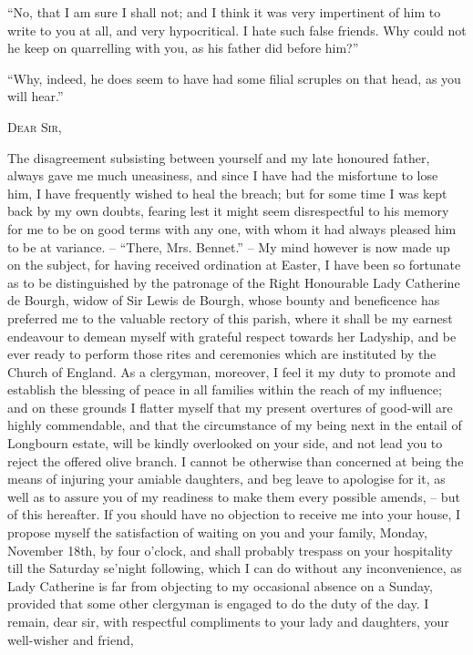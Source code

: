 “No, that I am sure I shall not; and I think it was
very impertinent of him to write to you at all, and very
hypocritical. I hate such false friends. Why could not
he keep on quarrelling with you, as his father did before
him?”

“Why, indeed, he does seem to have had some filial
scruples on that head, as you will hear.”

\begin{letter}

\textsc{Dear Sir},

The disagreement subsisting between yourself and
my late honoured father, always gave me much uneasiness,
and since I have had the misfortune to lose him, I have
frequently wished to heal the breach; but for some time
I was kept back by my own doubts, fearing lest it might
seem disrespectful to his memory for me to be on good
terms with any one, with whom it had always pleased
him to be at variance. -- “There, Mrs. Bennet.” -- My mind
however is now made up on the subject, for having received
ordination at Easter, I have been so fortunate as to be
distinguished by the patronage of the Right Honourable
Lady Catherine de Bourgh, widow of Sir Lewis de Bourgh,
whose bounty and beneficence has preferred me to the
valuable rectory of this parish, where it shall be my
earnest endeavour to demean myself with grateful respect
towards her Ladyship, and be ever ready to perform those
rites and ceremonies which are instituted by the Church
of England. As a clergyman, moreover, I feel it my duty
to promote and establish the blessing of peace in all families
within the reach of my influence; and on these grounds
I flatter myself that my present overtures of good-will
are highly commendable, and that the circumstance of
my being next in the entail of Longbourn estate, will be
kindly overlooked on your side, and not lead you to reject
the offered olive branch. I cannot be otherwise than
concerned at being the means of injuring your amiable
daughters, and beg leave to apologise for it, as well as to
assure you of my readiness to make them every possible
amends, -- but of this hereafter. If you should have no
objection to receive me into your house, I propose myself
the satisfaction of waiting on you and your family,
Monday, November 18th, by four o’clock, and shall
probably trespass on your hospitality till the Saturday
se’night following, which I can do without any inconvenience,
as Lady Catherine is far from objecting to
my occasional absence on a Sunday, provided that some
other clergyman is engaged to do the duty of the day.
I remain, dear sir, with respectful compliments to your
lady and daughters, your well-wisher and friend,

\end{letter}

